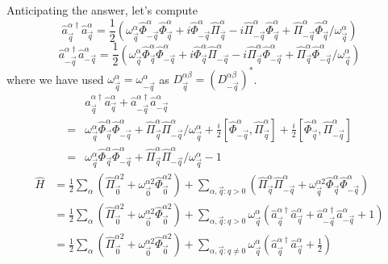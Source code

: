 Anticipating the answer, let's compute
\[ \hat{a}_{\vec{q}}^{\alpha \dagger}\hat{a}_{\vec{q}}^{\alpha}=\frac{1}{2}\left( \omega _{\vec{q}}^{\alpha}\hat{\Phi}_{-\vec{q}}^{\alpha}\hat{\Phi}_{\vec{q}}^{\alpha}+i\hat{\Phi}_{-\vec{q}}^{\alpha}\hat{\Pi}_{\vec{q}}^{\alpha}-i\hat{\Pi}_{-\vec{q}}^{\alpha}\hat{\Phi}_{\vec{q}}^{\alpha}+\hat{\Pi}_{-\vec{q}}^{\alpha}\hat{\Phi}_{\vec{q}}^{\alpha}/\omega _{\vec{q}}^{\alpha} \right) \]
\[ \hat{a}_{-\vec{q}}^{\alpha \dagger}\hat{a}_{-\vec{q}}^{\alpha}=\frac{1}{2}\left( \omega _{\vec{q}}^{\alpha}\hat{\Phi}_{\vec{q}}^{\alpha}\hat{\Phi}_{-\vec{q}}^{\alpha}+i\hat{\Phi}_{\vec{q}}^{\alpha}\hat{\Pi}_{-\vec{q}}^{\alpha}-i\hat{\Pi}_{\vec{q}}^{\alpha}\hat{\Phi}_{-\vec{q}}^{\alpha}+\hat{\Pi}_{\vec{q}}^{\alpha}\hat{\Phi}_{-\vec{q}}^{\alpha}/\omega _{\vec{q}}^{\alpha} \right) \]
where we have used $\omega _{\vec{q}}^{\alpha}=\omega _{-\vec{q}}^{\alpha}$ as $D_{\vec{q}}^{\alpha \beta}=\left( D_{-\vec{q}}^{\alpha \beta} \right) ^*$.
\begin{align*}
    &\hat{a}_{\vec{q}}^{\alpha \dagger}\hat{a}_{\vec{q}}^{\alpha}+\hat{a}_{-\vec{q}}^{\alpha \dagger}\hat{a}_{-\vec{q}}^{\alpha}\\
    =&\omega _{\vec{q}}^{\alpha}\hat{\Phi}_{\vec{q}}^{\alpha}\hat{\Phi}_{-\vec{q}}^{\alpha}+\hat{\Pi}_{\vec{q}}^{\alpha}\hat{\Pi}_{-\vec{q}}^{\alpha}/\omega _{\vec{q}}^{\alpha}+\frac{i}{2}\left[ \hat{\Phi}_{-\vec{q}}^{\alpha},\hat{\Pi}_{\vec{q}}^{\alpha} \right] +\frac{i}{2}\left[ \hat{\Phi}_{\vec{q}}^{\alpha},\hat{\Pi}_{-\vec{q}}^{\alpha} \right] \\
    =&\omega _{\vec{q}}^{\alpha}\hat{\Phi}_{\vec{q}}^{\alpha}\hat{\Phi}_{-\vec{q}}^{\alpha}+\hat{\Pi}_{\vec{q}}^{\alpha}\hat{\Pi}_{-\vec{q}}^{\alpha}/\omega _{\vec{q}}^{\alpha}-1
\end{align*}
\begin{align*}
    \hat{H}&=\frac{1}{2}\sum_{\alpha}{\left( \hat{\Pi}_{\vec{0}}^{\alpha 2}+\omega _{\vec{0}}^{\alpha 2}\hat{\Phi}_{\vec{0}}^{\alpha 2} \right)}+\sum_{\alpha ,\vec{q}:q>0}{\left( \hat{\Pi}_{\vec{q}}^{\alpha}\hat{\Pi}_{-\vec{q}}^{\alpha}+\omega _{\vec{q}}^{\alpha 2}\hat{\Phi}_{\vec{q}}^{\alpha}\hat{\Phi}_{-\vec{q}}^{\alpha} \right)}\\
    &=\frac{1}{2}\sum_{\alpha}{\left( \hat{\Pi}_{\vec{0}}^{\alpha 2}+\omega _{\vec{0}}^{\alpha 2}\hat{\Phi}_{\vec{0}}^{\alpha 2} \right)}+\sum_{\alpha ,\vec{q}:q>0}{\omega _{\vec{q}}^{\alpha}\left( \hat{a}_{\vec{q}}^{\alpha \dagger}\hat{a}_{\vec{q}}^{\alpha}+\hat{a}_{-\vec{q}}^{\alpha \dagger}\hat{a}_{-\vec{q}}^{\alpha}+1 \right)}\\
    &=\frac{1}{2}\sum_{\alpha}{\left( \hat{\Pi}_{\vec{0}}^{\alpha 2}+\omega _{\vec{0}}^{\alpha 2}\hat{\Phi}_{\vec{0}}^{\alpha 2} \right)}+\sum_{\alpha ,\vec{q}:q\ne 0}{\omega _{\vec{q}}^{\alpha}\left( \hat{a}_{\vec{q}}^{\alpha \dagger}\hat{a}_{\vec{q}}^{\alpha}+\frac{1}{2} \right)}
\end{align*}
